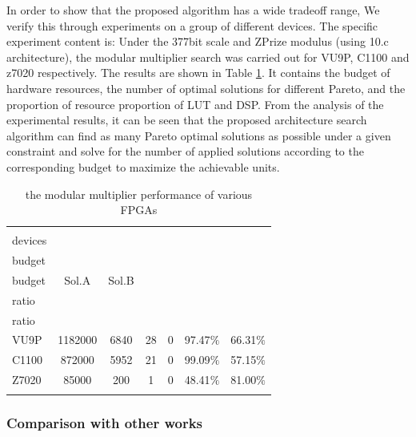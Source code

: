 \documentclass[conference]{IEEEtran}
\begin{document}
In order to show that the proposed algorithm has a wide tradeoff range, We verify this through experiments on a group of different devices. The specific experiment content is:
Under the 377bit scale and ZPrize modulus (using 10.c architecture), the modular multiplier search was carried out for VU9P, C1100 and z7020 respectively. The results are shown in Table \ref{performance of various FPGAs}. It contains the budget of hardware resources, the number of optimal solutions for different Pareto, and the proportion of resource proportion of LUT and DSP. From the analysis of the experimental results, it can be seen that the proposed architecture search algorithm can find as many Pareto optimal solutions as possible under a given constraint and solve for the number of applied solutions according to the corresponding budget to maximize the achievable units.

\begin{table}[h]
    \centering
    \caption{the modular multiplier performance of various FPGAs}
    \renewcommand{\arraystretch}{2}
    \begin{tabular}{l|c|c|c|c|c|c}
                \Xhline{1.5pt}
                \makecell[c]{Target \\ devices}  &  \makecell[c]{LUT \\ budget} & \makecell[c]{DSP \\ budget}  & Sol.A & Sol.B & \makecell[c]{LUT \\ ratio} &  \makecell[c]{DSP \\ ratio} \\
                \Xhline{1pt}
                VU9P                      &  1182000       &    6840    & 28 & 0 & 97.47$\%$ & 66.31$\%$     \\ 
                \Xhline{1pt}
                C1100                     &  872000       &    5952    & 21 & 0 & 99.09$\%$ & 57.15$\%$       \\ 
                \Xhline{1pt}
                Z7020                     &  85000       &    200    & 1 & 0 & 48.41$\%$ & 81.00$\%$       \\ 
                \Xhline{1.5pt}    
    \end{tabular}
    \label{performance of various FPGAs}
\end{table}

\subsubsection{Comparison with other works}
\end{document}
